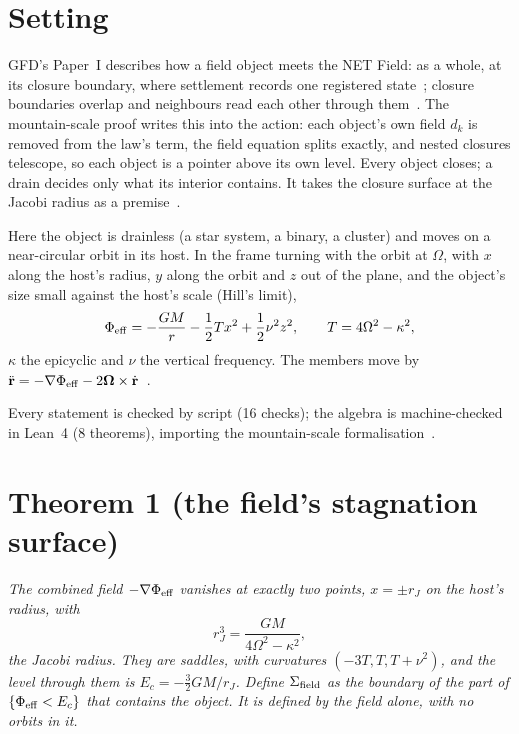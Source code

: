 \documentclass[twocolumn]{iopjournal}
\begin{document}
\section*{Setting}

GFD's Paper~I describes how a field object meets the NET Field: as a
whole, at its closure boundary, where settlement records one registered
state~\cite{NelsonI}; closure boundaries overlap and neighbours read
each other through them~\cite{NelsonII}. The mountain-scale proof writes
this into the action: each object's own field $d_k$ is removed from the
law's term, the field equation splits exactly, and nested closures
telescope, so each object is a pointer above its own level. Every object
closes; a drain decides only what its interior contains. It takes the
closure surface at the Jacobi radius as a premise~\cite{NelsonMS}.

Here the object is drainless (a star system, a binary, a cluster) and
moves on a near-circular orbit in its host. In the frame turning with
the orbit at $\Omega$, with $x$ along the host's radius, $y$ along the
orbit and $z$ out of the plane, and the object's size small against the
host's scale (Hill's limit),
\begin{equation}
\Phi_{\rm eff} = -\frac{GM}{r} - \frac12 T x^2 + \frac12\nu^2z^2,\qquad
T = 4\Omega^2 - \kappa^2,
\label{eq:phi}
\end{equation}
$\kappa$ the epicyclic and $\nu$ the vertical frequency. The members
move by $\ddot{\mathbf r} = -\nabla\Phi_{\rm eff} - 2\boldsymbol\Omega
\times\dot{\mathbf r}$~\cite{BT2008}.

Every statement is checked by script (16 checks); the algebra is
machine-checked in Lean~4 (8 theorems), importing the mountain-scale
formalisation~\cite{NelsonScript}.


\section*{Theorem 1 (the field's stagnation surface)}

\emph{The combined field $-\nabla\Phi_{\rm eff}$ vanishes at exactly two
points, $x = \pm r_J$ on the host's radius, with
\[
r_J^3 = \frac{GM}{4\Omega^2 - \kappa^2},
\]
the Jacobi radius. They are saddles, with curvatures $(-3T, T, T +
\nu^2)$, and the level through them is $E_c = -\tfrac32GM/r_J$. Define
$\Sigma_{\rm field}$ as the boundary of the part of $\{\Phi_{\rm eff} <
E_c\}$ that contains the object. It is defined by the field alone, with
no orbits in it.}
\end{document}
